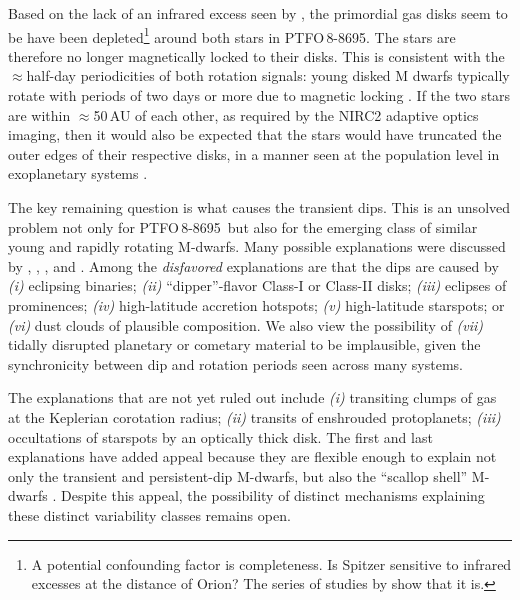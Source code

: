 \documentclass[12pt,twocolumn,tighten]{aastex62}
\newcommand{\ptfo}{PTFO$\,$8-8695}
\begin{document}
Based on the lack of an infrared excess seen by \citet{yu_tests_2015},
the primordial gas disks seem to be have been depleted\footnote{A
potential confounding factor is completeness. Is Spitzer sensitive to
infrared excesses at the distance of Orion? The series of studies by
\cite{hernandez_spitzer_2006,hernandez_spitzer_ob1_2007,hernandez_spitzer_sig_2007,hernandez_spitzer_2009}
show that it is.}
around both stars in \ptfo. The stars are therefore no longer
magnetically locked to their disks.  This is consistent with the
$\approx$half-day periodicities of both rotation signals: young disked
M dwarfs typically rotate with periods of two days or more due to
magnetic locking \citep[{\it e.g.},][]{rebull_rotation_2020}.  If the
two stars are within $\approx$50$\,$AU of each other, as required by
the NIRC2 adaptive optics imaging, then it would also be expected that
the stars would have truncated the outer edges of their respective
disks, in a manner seen at the population level in exoplanetary
systems \citep{kraus_impact_2016,moe_impact_2019}.

The key remaining question is what causes the transient dips. This is
an unsolved problem not only for \ptfo\ but also for the emerging
class of similar young and rapidly rotating M-dwarfs.  Many possible
explanations were discussed by \citet{rebull_rotation_2016},
\citet{david_transient_2017}, \citet{stauffer_orbiting_2017}, and
\citet{zhan_complex_2019}.  Among the {\it disfavored} explanations
are that the dips are caused by
{\it (i)} eclipsing binaries;
{\it (ii)} ``dipper''-flavor Class-I or Class-II disks;
{\it (iii)} eclipses of prominences;
{\it (iv)} high-latitude accretion hotspots;
{\it (v)} high-latitude starspots;
or
{\it (vi)} dust clouds of plausible composition.
We also view the possibility of {\it (vii)} tidally disrupted
planetary or cometary material to be implausible, given the
synchronicity between dip and rotation periods seen across many
systems.

The explanations that are not yet ruled out include {\it (i)}
transiting clumps of gas at the Keplerian corotation radius; {\it
(ii)} transits of enshrouded protoplanets; {\it (iii)} occultations of
starspots by an optically thick disk.  The first and last explanations
have added appeal because they are flexible enough to explain not only
the transient and persistent-dip M-dwarfs, but also the ``scallop
shell'' M-dwarfs \citep{stauffer_orbiting_2017}.  Despite this appeal,
the possibility of distinct mechanisms explaining these distinct
variability classes remains open.
\end{document}
